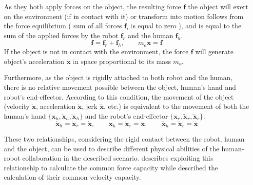 As they both apply forces on the object, the resulting force $\bm{f}$ the object will exert on the environment (if in contact with it) or transform into motion follows from the force equilibrium ( sum of all forces $\bm{f}_i$ is equal to zero ), and is equal to the sum of the applied forces by the robot $\bm{f}_r$ and the human $\bm{f}_h$. 
\begin{equation}
    \bm{f} = \bm{f}_r + \bm{f}_h, \qquad  m_o\ddot{\bm{x}} = \bm{f} 
\end{equation}
If the object is not in contact with the environment, the force $\bm{f}$ will generate object's acceleration $\ddot{\bm{x}}$  in space proportional to its mass $m_o$.

Furthermore, as the object is rigidly attached to both robot and the human, there is no relative movement possible between the object, human's hand and robot's end-effector. According to this condition, the movement of the object (velocity $\dot{\bm{x}}$, acceleration $\ddot{\bm{x}}$, jerk $\dddot{\bm{x}}$, etc.) is equivalent to the movement of both the human's hand $\{\dot{\bm{x}}_h,\ddot{\bm{x}}_h,\dddot{\bm{x}}_h\}$ and the robot's end-effector $\{\dot{\bm{x}}_r,\ddot{\bm{x}}_r,\dddot{\bm{x}}_r\}$.
\begin{equation}
    \dot{\bm{x}}_h=\dot{\bm{x}}_r=\dot{\bm{x}}, \qquad
    \ddot{\bm{x}}_h=\ddot{\bm{x}}_r=\ddot{\bm{x}}, \qquad
    \dddot{\bm{x}}_h=\dddot{\bm{x}}_r=\dddot{\bm{x}}
    \label{eq:kinematic_condition_contact}
\end{equation}

These two relationships, considering the rigid contact between the robot, human and the object, can be used to describe different physical abilities of the human-robot collaboration in the described scenario.  describes exploiting this relationship to calculate the common force capacity while  described the calculation of their common velocity capacity.




